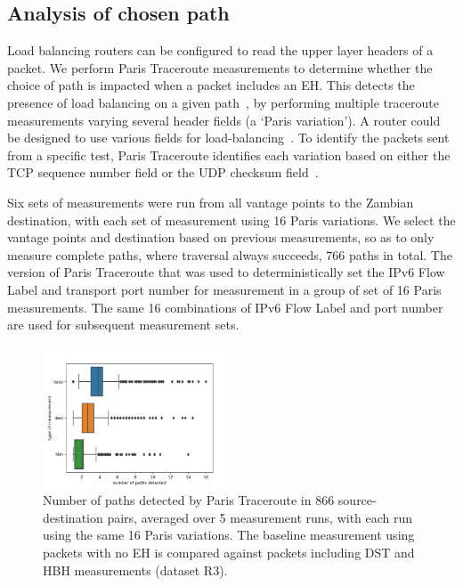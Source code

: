 \documentclass[conference]{IEEEtran}
\begin{document}
\subsection{Analysis of chosen path}

Load balancing routers can be configured to read the upper layer headers of a packet. We perform Paris Traceroute measurements to determine whether the choice of path is impacted when a packet includes an EH. This detects the presence of load balancing on a given path~\cite{augustin2006avoiding}, by performing multiple traceroute measurements varying several header fields (a `Paris variation'). A router could be designed to use various fields for load-balancing~\cite{lb-classification}. To identify the packets sent from a specific test, Paris Traceroute identifies each variation based on either the TCP sequence number field or the UDP checksum field~\cite{augustin2006avoiding}.

Six sets of measurements were run from all vantage points to the Zambian destination, with each set of measurement using 16 Paris variations. We select the vantage points and destination based on previous measurements, so as to only measure complete paths, where traversal always succeeds, 766 paths in total. The version of Paris Traceroute that was used to deterministically set the IPv6 Flow Label and transport port number for measurement in a group of set of 16 Paris measurements. The same 16 combinations of IPv6 Flow Label and port number are used for subsequent measurement sets.

\begin{figure}
\centering
  \includegraphics[width=0.5\textwidth]{boxplot-paths-detected.png}
  \caption{Number of paths detected by Paris Traceroute in 866 source-destination pairs, averaged over 5 measurement runs, with each run using the same 16 Paris variations. The baseline measurement using packets with no EH is compared against packets including DST and HBH measurements (dataset R3).}
  \label{fig:paths-detected}
\end{figure}
\end{document}
